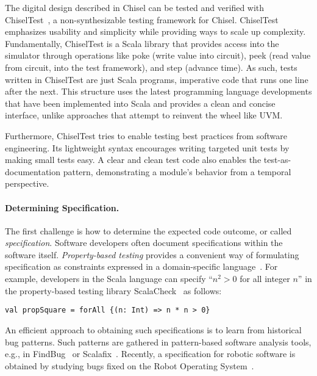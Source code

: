 \documentclass[fleqn,12pt]{article}
\begin{document}
The digital design described in Chisel can be tested and verified with
ChiselTest~\cite{chisel:tester2}, a non-synthesizable testing framework for Chisel.
ChiselTest emphasizes usability and simplicity while providing ways to scale up complexity.
Fundamentally, ChiselTest is a Scala library that provides access into the simulator through
operations like poke (write value into circuit), peek (read value from circuit, into the test framework), and step (advance time).
As such, tests written in ChiselTest are just Scala programs, imperative code that runs one line after the next.
This structure uses the latest programming language developments that have been implemented into Scala
and provides a clean and concise interface, unlike approaches that attempt to reinvent the wheel like UVM.

Furthermore, ChiselTest tries to enable testing best practices from software engineering.
Its lightweight syntax encourages writing targeted unit tests by making small tests easy.
A clear and clean test code also enables the test-as-documentation pattern,
demonstrating a module's behavior from a temporal perspective.

\paragraph{Determining Specification.}
The first challenge is how to determine the expected code outcome, or
called \emph{specification}.  Software developers often document
specifications within the software itself.  \emph{Property-based testing}
provides a convenient way of formulating specification as constraints
expressed in a domain-specific
language~\cite{DBLP:conf/icfp/ClaessenH00}.  For example, developers
in the Scala language can specify ``$n^2>0$ for all integer $n$'' in the
property-based testing library ScalaCheck~\cite{nilsson2014scalacheck}
as follows:
\begin{lstlisting}[numbers=none]
val propSquare = forAll {(n: Int) => n * n > 0}
\end{lstlisting}
An efficient approach to obtaining such specifications is to learn from
historical bug patterns. Such patterns are gathered in pattern-based
software analysis tools, e.g., in
FindBug~\cite{DBLP:conf/paste/AyewahPMPZ07} or
Scalafix~\cite{web:scalafix}.  Recently, a specification for robotic
software is obtained by studying bugs fixed on the Robot
Operating System~\cite{nielsenFSW2020dependencybugs}.
\end{document}
